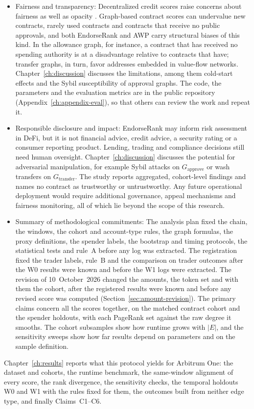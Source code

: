 \begin{itemize}
\item{}\label{sub:fairness-transparency}
  Fairness and transparency: Decentralized credit scores raise concerns about fairness as well as opacity \parencite{packin2024credit}. Graph-based contract scores can undervalue new contracts, rarely used contracts and contracts that receive no public approvals, and both EndorseRank and AWP carry structural biases of this kind. In the allowance graph, for instance, a contract that has received no spending authority is at a disadvantage relative to contracts that have; transfer graphs, in turn, favor addresses embedded in value-flow networks. Chapter~\ref{ch:discussion} discusses the limitations, among them cold-start effects and the Sybil susceptibility of approval graphs. The code, the parameters and the evaluation metrics are in the public repository (Appendix~\ref{ch:appendix-eval}), so that others can review the work and repeat it.


\item{}\label{sub:responsible-disclosure}
  Responsible disclosure and impact: EndorseRank may inform risk assessment in DeFi, but it is not financial advice, credit advice, a security rating or a consumer reporting product. Lending, trading and compliance decisions still need human oversight. Chapter~\ref{ch:discussion} discusses the potential for adversarial manipulation, for example Sybil attacks on $G_{\text{approve}}$ or wash transfers on $G_{\text{transfer}}$. The study reports aggregated, cohort-level findings and names no contract as trustworthy or untrustworthy. Any future operational deployment would require additional governance, appeal mechanisms and fairness monitoring, all of which lie beyond the scope of this research.


\item{}\label{sub:methodological-commitments}
  Summary of methodological commitments: The analysis plan fixed the chain, the windows, the cohort and account-type rules, the graph formulas, the proxy definitions, the spender labels, the bootstrap and timing protocols, the statistical tests and rule~A before any log was extracted. The registration fixed the trader labels, rule~B and the comparison on trader outcomes after the W0 results were known and before the W1 logs were extracted. The revision of 10~October~2026 changed the amounts, the token set and with them the cohort, after the registered results were known and before any revised score was computed (Section~\ref{sec:amount-revision}). The primary claims concern all the scores together, on the matched contract cohort and the spender holdouts, with each PageRank set against the raw degree it smooths. The cohort subsamples show how runtime grows with $|E|$, and the sensitivity sweeps show how far results depend on parameters and on the sample definition.
\end{itemize}

Chapter~\ref{ch:results} reports what this protocol yields for Arbitrum One: the dataset and cohorts, the runtime benchmark, the same-window alignment of every score, the rank divergence, the sensitivity checks, the temporal holdouts W0 and W1 with the rules fixed for them, the outcomes built from neither edge type, and finally Claims~C1--C6.
